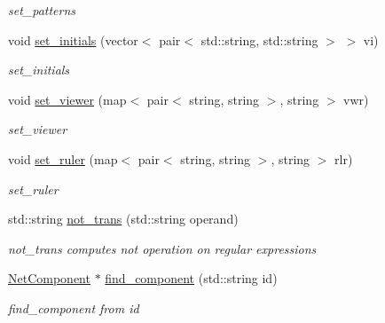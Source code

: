\begin{DoxyCompactItemize}
\begin{DoxyCompactList}\small\item\em set\+\_\+patterns \end{DoxyCompactList}\item 
void \hyperlink{class_network_model_abd3d5fb2d8fa7f4d7337101d017ad7cc}{set\+\_\+initials} (vector$<$ pair$<$ std\+::string, std\+::string $>$ $>$ vi)
\begin{DoxyCompactList}\small\item\em set\+\_\+initials \end{DoxyCompactList}\item 
void \hyperlink{class_network_model_a0ab949112040285f3dccbef024562c88}{set\+\_\+viewer} (map$<$ pair$<$ string, string $>$, string $>$ vwr)
\begin{DoxyCompactList}\small\item\em set\+\_\+viewer \end{DoxyCompactList}\item 
void \hyperlink{class_network_model_a22f2b04c55a7e8ea7d48bc392c7874b3}{set\+\_\+ruler} (map$<$ pair$<$ string, string $>$, string $>$ rlr)
\begin{DoxyCompactList}\small\item\em set\+\_\+ruler \end{DoxyCompactList}\item 
std\+::string \hyperlink{class_network_model_a0cdc08acf73010472700db9d690eb4d2}{not\+\_\+trans} (std\+::string operand)
\begin{DoxyCompactList}\small\item\em not\+\_\+trans computes not operation on regular expressions \end{DoxyCompactList}\item 
\hyperlink{class_net_component}{Net\+Component} $\ast$ \hyperlink{class_network_model_ab2edbaffc9e90c754cbb3ac5b515d74f}{find\+\_\+component} (std\+::string id)
\begin{DoxyCompactList}\small\item\em find\+\_\+component from id \end{DoxyCompactList}\end{DoxyCompactItemize}
